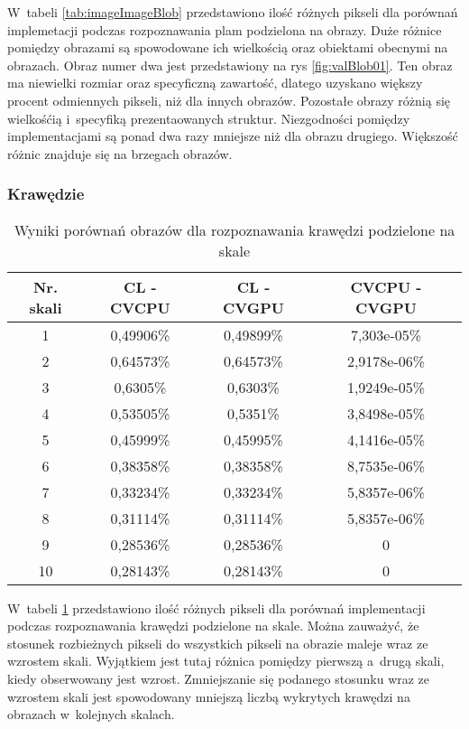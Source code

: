 W~tabeli \ref{tab:imageImageBlob} przedstawiono ilość różnych pikseli dla porównań implemetacji podczas rozpoznawania plam podzielona na obrazy. Duże różnice pomiędzy obrazami są spowodowane ich wielkością oraz obiektami obecnymi na obrazach. Obraz numer dwa jest przedstawiony na rys \ref{fig:valBlob01}. Ten obraz ma niewielki rozmiar oraz specyficzną zawartość, dlatego uzyskano większy procent odmiennych pikseli, niż dla innych obrazów. Pozostałe obrazy różnią się wielkośćią i~specyfiką prezentaowanych struktur. Niezgodności pomiędzy implementacjami są ponad dwa razy mniejsze niż dla obrazu drugiego. Większość różnic znajduje się na brzegach obrazów.

\subsubsection{Krawędzie}
\label{subsubsec:krawedzieTabele}

\begin{center}
\begin{table}
\centering
\caption{Wyniki porównań obrazów dla rozpoznawania krawędzi podzielone na skale}
\label{tab:imageScaleEdge}
\begin{tabular}{|c|c|c|c|}
 \hline
Nr. skali & CL - CVCPU & CL - CVGPU & CVCPU - CVGPU \\ \hline
1 & 0,49906\% & 0,49899\% & 7,303e-05\% \\ \hline
2 & 0,64573\% & 0,64573\% & 2,9178e-06\% \\ \hline
3 & 0,6305\% & 0,6303\% & 1,9249e-05\% \\ \hline
4 & 0,53505\% & 0,5351\% & 3,8498e-05\% \\ \hline
5 & 0,45999\% & 0,45995\% & 4,1416e-05\% \\ \hline
6 & 0,38358\% & 0,38358\% & 8,7535e-06\% \\ \hline
7 & 0,33234\% & 0,33234\% & 5,8357e-06\% \\ \hline
8 & 0,31114\% & 0,31114\% & 5,8357e-06\% \\ \hline
9 & 0,28536\% & 0,28536\% & 0 \\ \hline
10 & 0,28143\% & 0,28143\% & 0 \\ \hline
\end{tabular}
\end{table}
\end{center}

W~tabeli \ref{tab:imageScaleEdge} przedstawiono ilość różnych pikseli dla porównań implementacji podczas rozpoznawania krawędzi podzielone na skale. Można zauważyć, że stosunek rozbieżnych pikseli do wszystkich pikseli na obrazie maleje wraz ze wzrostem skali. Wyjątkiem jest tutaj różnica pomiędzy pierwszą a~drugą skali, kiedy obserwowany jest wzrost. Zmniejszanie się podanego stosunku wraz ze wzrostem skali jest spowodowany mniejszą liczbą wykrytych krawędzi na obrazach w~kolejnych skalach.

